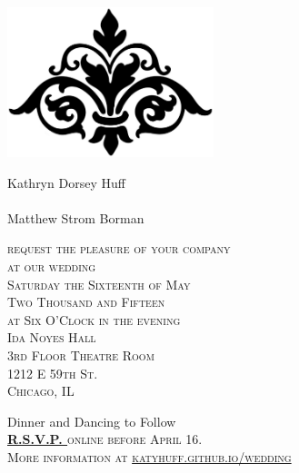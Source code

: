 \documentclass{letter}[12pt]
\newcommand*\initfamily{\usefont{U}{Typocaps}{xl}{n}}
\begin{document}
\begin{letter}{}
   \begin{center}
     \includegraphics[width=6cm]{flourish.eps}

     \vspace{5mm}

\normalfont\calligra
\Large
{\selectfont\Huge K}athryn
{\selectfont\Huge D}orsey
{\selectfont\Huge H}uff\\
{\selectfont{and}}\\
{\selectfont\Huge M}atthew 
{\selectfont\Huge S}trom
{\selectfont\Huge B}orman

     \vspace{5mm}

{\normalfont\scshape\normalsize
     request the pleasure of your company\\
     at our wedding\\
     Saturday the Sixteenth of May\\
     Two Thousand and Fifteen\\
     at Six O'Clock in the evening\\
     Ida Noyes Hall\\
     3rd Floor Theatre Room\\
     1212 E 59th St.\\
     Chicago, IL

     \vspace{2mm}
}
     {\selectfont Dinner and Dancing to Follow}\\
     \vspace{2mm}
     {\normalfont\scshape\normalsize \textbf{\href{http://bit.ly/skwed}{R.S.V.P. }}online before April 16.\\
     More information at \href{http://katyhuff.github.io/wedding}{katyhuff.github.io/wedding}}

     \vspace{5mm}
    
   \end{center}

       \end{letter}
       
\end{document}
